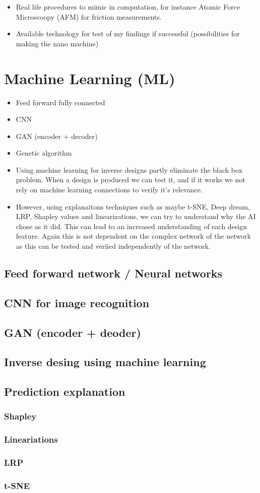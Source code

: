 \begin{itemize}
  \item Real life procedures to mimic in computation, for instance Atomic Force Microscoopy (AFM) for friction measurements.
  \item Available technology for test of my findings if successful (possibilities for making the nano machine) 
\end{itemize}


\section{Machine Learning (ML)}
\begin{itemize}
  \item Feed forward fully connected
  \item CNN
  \item GAN (encoder + decoder)
  \item Genetic algorithm
  \item Using machine learning for inverse designs partly eliminate the black box problem. When a design is produced we can test it, and if
  it works we not rely on machine learning connections to verify it's relevance. 
  \item However, using explanaitons techniques such as maybe t-SNE, Deep dream, LRP, Shapley values and linearizations, we can try to
  understand why the AI chose as it did. This can lead to an increased understanding of each design feature. Again this is not dependent on
  the complex network of the network as this can be tested and veriied independently of the network. 
\end{itemize}

\subsection{Feed forward network / Neural networks}
\subsection{CNN for image recognition}
\subsection{GAN (encoder + deoder)}
\subsection{Inverse desing using machine learning}
\subsection{Prediction explanation}
\subsubsection{Shapley}
\subsubsection{Lineariations}
\subsubsection{LRP}
\subsubsection{t-SNE}



